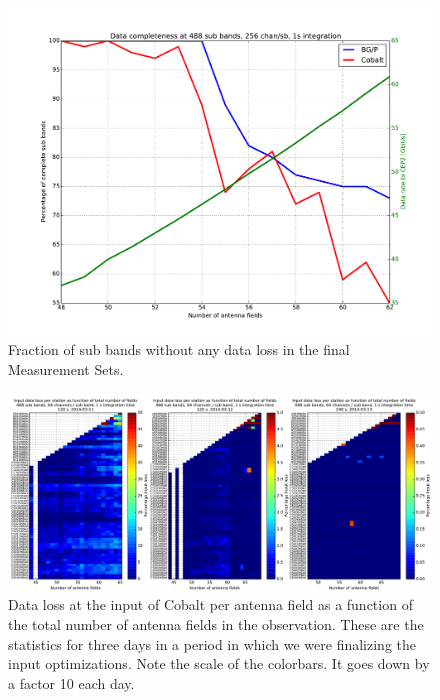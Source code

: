 \documentclass[a4paper,twoside, 10pt]{report}
\begin{document}
\begin{figure}
\begin{center}
\includegraphics[width=0.8\columnwidth]{cobalt-performance-subband-completeness-202756-202772.pdf}
\end{center}
\caption{Fraction of sub bands without any data loss in the final
  Measurement Sets.}
\label{fig:data-completeness-correlator}
\end{figure}


\begin{figure}
  \begin{center}
    \includegraphics[angle=0,width=\columnwidth]{correlator-input-loss-as-function-of-field.pdf}
  \end{center}
  \caption{Data loss at the input of Cobalt per antenna field as a
    function of the total number of antenna fields in the
    observation. These are the statistics for three days in a period
    in which we were finalizing the input optimizations. Note the
    scale of the colorbars. It goes down by a factor 10 each day.}
  \label{fig:correlator-input-loss}
\end{figure}
\end{document}
